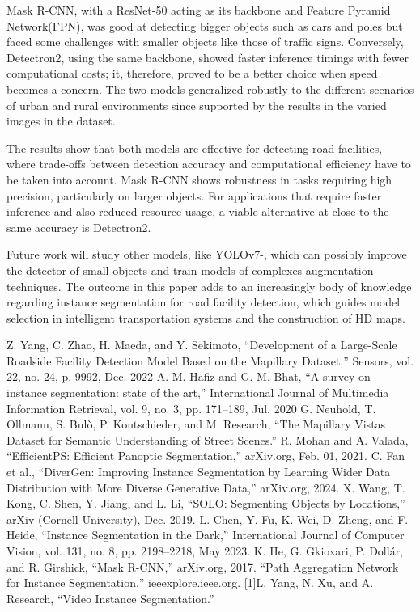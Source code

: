 \documentclass[conference]{IEEEtran}
\begin{document}
Mask R-CNN, with a ResNet-50 acting as its backbone and Feature Pyramid Network(FPN), was good at detecting bigger objects such as cars and poles but faced some challenges with smaller objects like those of traffic signs. Conversely, Detectron2, using the same backbone, showed faster inference timings with fewer computational costs; it, therefore, proved to be a better choice when speed becomes a concern. The two models generalized robustly to the different scenarios of urban and rural environments since supported by the results in the varied images in the dataset.

The results show that both models are effective for detecting road facilities, where trade-offs between detection accuracy and computational efficiency have to be taken into account. Mask R-CNN shows robustness in tasks requiring high precision, particularly on larger objects. For applications that require faster inference and also reduced resource usage, a viable alternative at close to the same accuracy is Detectron2.

Future work will study other models, like YOLOv7\cite{1}-\cite{10}, which can possibly  improve the detector of small objects and train models of complexes augmentation techniques. The outcome in this paper adds to an increasingly body of knowledge regarding instance segmentation for road facility detection, which guides model selection in intelligent transportation systems and the construction of HD maps.

\begin{thebibliography}{00}
Z. Yang, C. Zhao, H. Maeda, and Y. Sekimoto, “Development of a Large-Scale Roadside Facility Detection Model Based on the Mapillary Dataset,” Sensors, vol. 22, no. 24, p. 9992, Dec. 2022
A. M. Hafiz and G. M. Bhat, “A survey on instance segmentation: state of the art,” International Journal of Multimedia Information Retrieval, vol. 9, no. 3, pp. 171–189, Jul. 2020
G. Neuhold, T. Ollmann, S. Bulò, P. Kontschieder, and M. Research, “The Mapillary Vistas Dataset for Semantic Understanding of Street Scenes.” 
R. Mohan and A. Valada, “EfficientPS: Efficient Panoptic Segmentation,” arXiv.org, Feb. 01, 2021.
C. Fan et al., “DiverGen: Improving Instance Segmentation by Learning Wider Data Distribution with More Diverse Generative Data,” arXiv.org, 2024.
X. Wang, T. Kong, C. Shen, Y. Jiang, and L. Li, “SOLO: Segmenting Objects by Locations,” arXiv (Cornell University), Dec. 2019.
L. Chen, Y. Fu, K. Wei, D. Zheng, and F. Heide, “Instance Segmentation in the Dark,” International Journal of Computer Vision, vol. 131, no. 8, pp. 2198–2218, May 2023.
K. He, G. Gkioxari, P. Dollár, and R. Girshick, “Mask R-CNN,” arXiv.org, 2017. 
‌“Path Aggregation Network for Instance Segmentation,” ieeexplore.ieee.org.
‌[1]L. Yang, N. Xu, and A. Research, “Video Instance Segmentation.” 
‌‌
\end{thebibliography}
\end{document}

